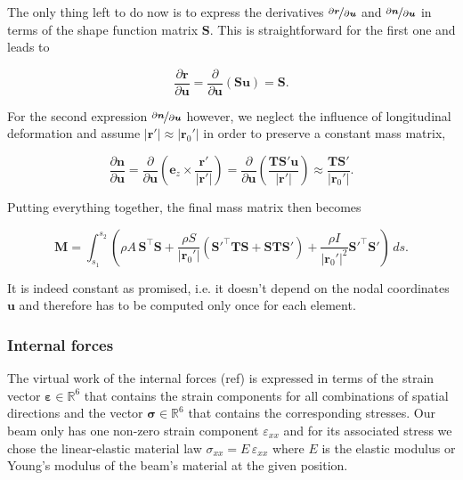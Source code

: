 The only thing left to do now is to express the derivatives $\nicefrac{\partial\boldsymbol{r}}{\partial\boldsymbol{u}}$ and $\nicefrac{\partial\boldsymbol{n}}{\partial\boldsymbol{u}}$ in terms of the shape function matrix $\boldsymbol{S}$.
This is straightforward for the first one and leads to

\begin{equation}
\frac{\partial\boldsymbol{r}}{\partial\boldsymbol{u}} = \frac{\partial}{\partial\boldsymbol{u}}\left(\boldsymbol{S}\boldsymbol{u}\right) = \boldsymbol{S}.
\end{equation}

For the second expression $\nicefrac{\partial\boldsymbol{n}}{\partial\boldsymbol{u}}$ however, we neglect the influence of longitudinal deformation and assume $|\boldsymbol{r}'| \approx |\boldsymbol{r}_{0}'|$ in order to preserve a constant mass matrix,

\begin{equation}
\frac{\partial\boldsymbol{n}}{\partial\boldsymbol{u}} = \frac{\partial}{\partial\boldsymbol{u}}\left(\boldsymbol{e}_{z} \times \frac{\boldsymbol{r}'}{|\boldsymbol{r}'|} \right) = \frac{\partial}{\partial\boldsymbol{u}}\left(\frac{\boldsymbol{T}\boldsymbol{S}'\boldsymbol{u}}{|\boldsymbol{r}'|} \right) \approx \frac{\boldsymbol{T}\boldsymbol{S}'}{|\boldsymbol{r}_{0}'|}.
\end{equation}

Putting everything together, the final mass matrix then becomes

\begin{equation}
\boldsymbol{M} = \int_{s_1}^{s_2} \left(\rho A\,\boldsymbol{S}^\intercal\boldsymbol{S} + \frac{\rho S}{|\boldsymbol{r}_{0}'|}\left(\boldsymbol{S}'^\intercal\boldsymbol{T}\boldsymbol{S} + \boldsymbol{S}\boldsymbol{T}\boldsymbol{S}'\right) + \frac{\rho I}{|\boldsymbol{r}_{0}'|^2}\boldsymbol{S}'^\intercal\boldsymbol{S}'\right)\,ds.
\end{equation}

It is indeed constant as promised, i.e. it doesn't depend on the nodal coordinates $\boldsymbol{u}$ and therefore has to be computed only once for each element.

\subsubsection{Internal forces}

The virtual work of the internal forces (ref) is expressed in terms of the strain vector $\boldsymbol{\varepsilon} \in \mathbb{R}^6$ that contains the strain components for all combinations of spatial directions and the vector $\boldsymbol{\sigma} \in \mathbb{R}^6$ that contains the corresponding stresses.
Our beam only has one non-zero strain component $\varepsilon_{xx}$ and for its associated stress we chose the linear-elastic material law $\sigma_{xx} = E\,\varepsilon_{xx}$ where $E$ is the elastic modulus or Young's modulus of the beam's material at the given position.

